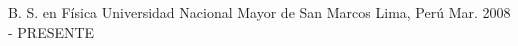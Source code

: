 

\begin{cventries}

  \cventry
    {B. S. en Física} %
    {Universidad Nacional Mayor de San Marcos} %
    {Lima, Perú} %
    {Mar. 2008 - PRESENTE} %
    {
    }
\end{cventries}
